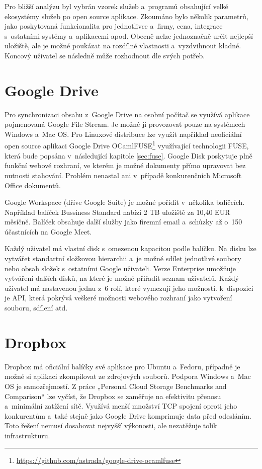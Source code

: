 Pro bližší analýzu byl vybrán vzorek služeb a programů obsahující velké ekosystémy služeb po open source aplikace. Zkoumáno bylo několik parametrů,
jako poskytovaná funkcionalita pro jednotlivce a firmy, cena, integrace s ostatními systémy a aplikacemi apod. Obecně nelze jednoznačně určit nejlepší uložiště, 
ale je možné poukázat na rozdílné vlastnosti a vyzdvihnout kladné. Koncový uživatel se následně může rozhodnout dle svých potřeb.

\section{Google Drive}

Pro synchronizaci obsahu z Google Drive na osobní počítač se využívá aplikace pojmenovaná Google File Stream. Je možné ji provozovat pouze na systémech
Windows a Mac OS.\cite{GoogleFileStream} Pro Linuxové distribuce lze využít například neoficiální open source aplikaci 
Google Drive OCamlFUSE\footnote{\url{https://github.com/astrada/google-drive-ocamlfuse}} využívající technologii
FUSE, která bude popsána v následující kapitole \ref{sec:fuse}. Google Disk poskytuje plně funkční webové rozhraní,
ve kterém je možné dokumenty přímo upravovat bez nutnosti stahování. Problém nenastal ani v případě konkurenčních Microsoft Office dokumentů. 

Google Workspace (dříve Google Suite) je možné pořídit v několika balíčcích. Například balíček Bussiness Standard nabízí 2 TB uložiště za 10,40 EUR měsíčně.
Balíček obsahuje další služby jako firemní email a schůzky až o 150 účastnících na Google Meet.\cite{GoogleWorkspace}

Každý uživatel má vlastní disk s omezenou kapacitou podle balíčku. Na disku lze vytvářet standartní složkovou hierarchii a je možné sdílet jednotlivé soubory nebo
obsah složek s ostatními Google uživateli. Verze Enterprise umožňuje vytváření dalších disků, na které je možné přiřadit seznam uživatelů. Každý uživatel
má nastavenou jednu z 6 rolí, které vymezují jeho možnosti. k dispozici je API, která pokrývá veškeré možnosti webového rozhraní jako vytvoření souboru,
sdílení atd.\cite{GoogleAPIReference}

\section{Dropbox}

Dropbox má oficiální balíčky své aplikace pro Ubuntu a Fedoru, případně je možné si aplikaci zkompilovat ze zdrojových souborů. Podpora Windows a Mac OS je samozřejmostí.
Z práce „Personal Cloud Storage Benchmarks and Comparison“ lze vyčíst, že Dropbox se zaměřuje na efektivitu přenosu a minimální zatížení sítě.
Využívá menší množství TCP spojení oproti jeho konkurentům a také stejně jako Google Drive komprimuje data před odesláním.\cite{CloudStorageComparison}
Toto řešení nemusí dosahovat nejvyšší výkonosti, ale nezatěžuje tolik infrastrukturu. 

